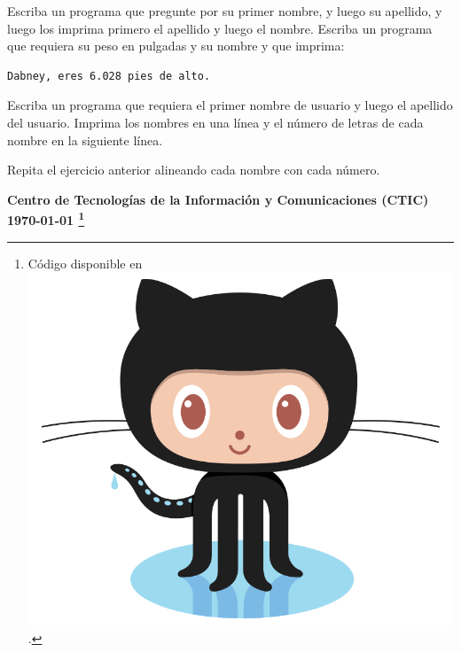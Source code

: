 \documentclass[spanish,addpoints,answers,a4paper]{exam}
\newcommand{\unmarkedfntext}[1]{%
	\begingroup
	\renewcommand\thefootnote{}\footnote{#1}%
	\addtocounter{footnote}{-1}%
	\endgroup
}
\newcommand{\mychar}{%
	\begingroup\normalfont
	\includegraphics[height=\fontcharht\font`\B]{Octocat.png}%
	\endgroup
}
\begin{document}
\begin{questions}
\question Escriba un programa que pregunte por su primer nombre, y luego su apellido, y luego los imprima primero el apellido y luego el nombre.
\question Escriba un programa que requiera su peso en pulgadas y su nombre y que imprima:
\begin{verbatim}
Dabney, eres 6.028 pies de alto.
\end{verbatim}

\question Escriba un programa que requiera el primer nombre de usuario y luego el apellido del usuario. Imprima los nombres en una línea y el número de letras de cada nombre en la siguiente línea.

\question Repita el ejercicio anterior alineando cada nombre con cada número.

\end{questions}

\begin{flushright}\bfseries
Centro de Tecnologías de la Información y Comunicaciones (CTIC)\\[2mm]
\today\unmarkedfntext{Código disponible en \href{https://github.com/carlosal1015/C-Programming}{\mychar{}}.}
\end{flushright}
\end{document}
